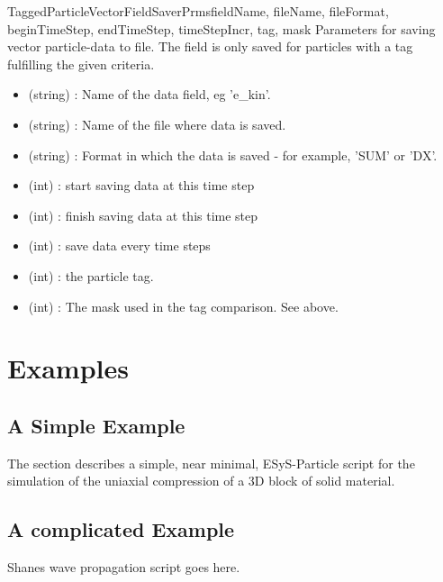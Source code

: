 \documentclass{manual}
\begin{document}
\begin{classdesc}{TaggedParticleVectorFieldSaverPrms}{fieldName, fileName, fileFormat, beginTimeStep, endTimeStep, timeStepIncr, tag, mask}
Parameters for saving vector particle-data to file.  The field is only saved for particles with a tag fulfilling the given criteria.
\begin{itemize}
\item {} (string) : Name of the data field, eg 'e_kin'.
\item {} (string) : Name of the file where data is saved.
\item {} (string) : Format in which the data is saved - for example, 'SUM' or 'DX'.
\item {} (int) : start saving data at this time step
\item {} (int) : finish saving data at this time step
\item {} (int) : save data every  time steps
\item {} (int) :  the particle tag.
\item {} (int) : The mask used in the tag comparison. See above.
\end{itemize}
\end{classdesc}


\chapter{Examples}
\section{A Simple Example}

The section describes a simple, near minimal, ESyS-Particle script for the simulation of the uniaxial compression of a 3D block of solid material. 

 


\section{A complicated Example}
Shanes wave propagation script goes here.

\end{document}
